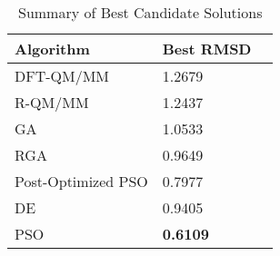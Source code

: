 \begin{table}
	\centering
	\begin{tabular}{ | l | l | l | }
		\hline
		Algorithm & Best RMSD \\ \hline
		DFT-QM/MM~\cite{luber2011s1} & 1.2679 \\ \hline
		R-QM/MM~\cite{luber2011s1} & 1.2437 \\ \hline
		GA & 1.0533 \\ \hline
		RGA & 0.9649 \\ \hline
		Post-Optimized PSO & 0.7977 \\ \hline
		DE & 0.9405 \\ \hline
		PSO & \textbf{0.6109} \\ \hline
	\end{tabular}
	\caption{Summary of Best Candidate Solutions}
	\label{fig:summary-rmsd}
\end{table}